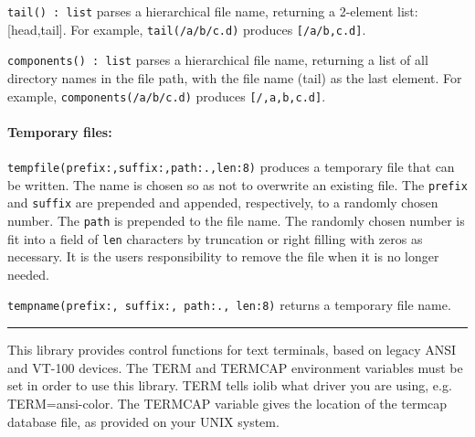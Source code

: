 \texttt{tail() : list} parses a hierarchical file name, returning a
2-element list: [head,tail]. For example,
\texttt{tail({\textquotedbl}/a/b/c.d{\textquotedbl})} produces
\texttt{[{\textquotedbl}/a/b{\textquotedbl},{\textquotedbl}c.d{\textquotedbl}]}.

\texttt{components() : list} parses a hierarchical file name, returning
a list of all directory names in the file path, with the file name
(tail) as the last element. For example,
\texttt{components({\textquotedbl}/a/b/c.d{\textquotedbl})} produces
\texttt{[{\textquotedbl}/{\textquotedbl},{\textquotedbl}a{\textquotedbl},{\textquotedbl}b{\textquotedbl},{\textquotedbl}c.d{\textquotedbl}]}.

\paragraph{Temporary files:}
\texttt{tempfile(prefix:{\textquotedbl}{\textquotedbl},suffix:{\textquotedbl}{\textquotedbl},path:{\textquotedbl}.{\textquotedbl},len:8)}
produces a temporary file that can be written. The name is chosen so as
not to overwrite an existing file. The \texttt{prefix} and
\texttt{suffix} are prepended and appended, respectively, to a randomly
chosen number. The \texttt{path} is prepended to the file name. The
randomly chosen number is fit into a field of \texttt{len} characters
by truncation or right filling with zeros as necessary. It is the
user{\textquotesingle}s responsibility to remove the file when it is no
longer needed.

\texttt{tempname(prefix:{\textquotedbl}{\textquotedbl},
suffix:{\textquotedbl}{\textquotedbl},
path:{\textquotedbl}.{\textquotedbl}, len:8)} returns a
temporary file name.

\vspace{0.25cm}\hrule{}

This library provides control functions for text terminals, based on
legacy ANSI and VT-100 devices. The TERM and TERMCAP environment variables must be set in order to use
this library. TERM tells iolib what driver you are using,
e.g. TERM=ansi-color. The TERMCAP variable
gives the location of the termcap database file, as provided on your
UNIX system.

